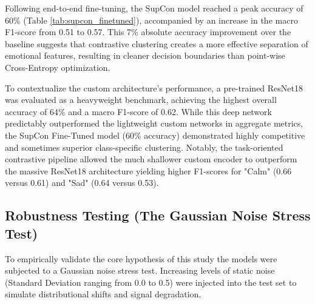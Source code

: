 \documentclass[12pt,hitec]{report}
\begin{document}
Following end-to-end fine-tuning, the SupCon model reached a peak accuracy of 60\% (Table \ref{tab:supcon_finetuned}), accompanied by an increase in the macro F1-score from 0.51 to 0.57. This 7\% absolute accuracy improvement over the baseline suggests that contrastive clustering creates a more effective separation of emotional features, resulting in cleaner decision boundaries than point-wise Cross-Entropy optimization.

To contextualize the custom architecture's performance, a pre-trained ResNet18 was evaluated as a heavyweight benchmark, achieving the highest overall accuracy of 64\% and a macro F1-score of 0.62. While this deep network predictably outperformed the lightweight custom networks in aggregate metrics, the SupCon Fine-Tuned model (60\% accuracy) demonstrated highly competitive and sometimes superior class-specific clustering. Notably, the task-oriented contrastive pipeline allowed the much shallower custom encoder to outperform the massive ResNet18 architecture yielding higher F1-scores for "Calm" (0.66 versus 0.61) and "Sad" (0.64 versus 0.53).


\subsection{Robustness Testing (The Gaussian Noise Stress Test)}

To empirically validate the core hypothesis of this study the models were subjected to a Gaussian noise stress test. Increasing levels of static noise (Standard Deviation ranging from 0.0 to 0.5) were injected into the test set to simulate distributional shifts and signal degradation. 
\end{document}
